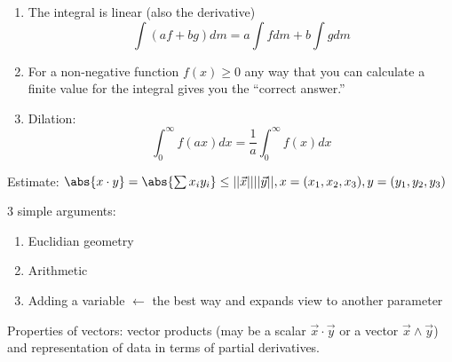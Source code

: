 \documentclass{scrreprt}
\begin{document}
\begin{enumerate}
	\item The integral is linear (also the derivative)
	\[
		\int(af+bg)dm=a\int fdm + b\int gdm
	\]
	\item For a non-negative function $f(x)\geq 0$ any way that you can calculate a
	finite value for the integral gives you the ``correct answer.''
	\item Dilation: \[
		\int_0^\infty f(ax)dx=\frac{1}{a}\int_0^\infty f(x)dx
	\]
\end{enumerate}

\begin{remark}

Estimate: $\abs{x\cdot y}=\abs{\sum x_i y_i}\leq||\vec{x}||||\vec{y}||, x =(x_1,x_2,x_3), y=(y_1,y_2,y_3)$ 

3 simple arguments:
\begin{enumerate}
	\item Euclidian geometry
	\item Arithmetic
	\item Adding a variable $\leftarrow$ the best way and expands view to another parameter
\end{enumerate}
\end{remark}
Properties of vectors:
vector products (may be a scalar $\vec{x}\cdot \vec{y}$ or a vector $\vec{x}\wedge \vec{y}$) and representation of data in terms of partial derivatives.
\end{document}
